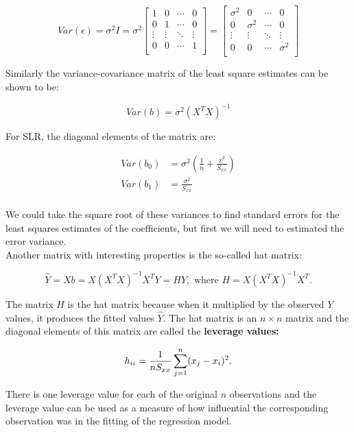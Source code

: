 \documentclass[a4paper, 11pt, twoside]{article}
\begin{document}
\[Var(\epsilon)=\sigma^2I=\sigma^2
\begin{bmatrix}
	1 & 0 & \cdots & 0\\
	0 & 1 & \cdots & 0\\
	\vdots & \vdots & \ddots & \vdots\\
	0 & 0 & \cdots & 1\\	
\end{bmatrix}
=
\begin{bmatrix}
	\sigma^2 & 0 & \cdots & 0\\
	0 & \sigma^2 & \cdots & 0\\
	\vdots & \vdots & \ddots & \vdots\\
	0 & 0 & \cdots & \sigma^2\\	
\end{bmatrix}
\]

Similarly the variance-covariance matrix of the least square estimates can be shown to be:

\[Var(b)=\sigma^2(X^TX)^{-1}\]

For SLR, the diagonal elements of the matrix are:

\[
\begin{split}
	Var(b_0)&=\sigma^2\left(\frac{1}{n} + \frac{\bar{x}^2}{S_{xx}}\right)\\	
	Var(b_1)&=\frac{\sigma^2}{S_{xx}}\\
\end{split}
\]

We could take the square root of these variances to find standard errors for the least squares estimates of the coefficients, but first we will need to estimated the error variance.\\

Another matrix with interesting properties is the so-called hat matrix:

\[\hat{Y}=Xb=X(X^TX)^{-1}X^TY=HY, \text{ where } H=X(X^TX)^{-1}X^T.\]

The matrix $H$ is the hat matrix because when it multiplied by the observed $Y$ values, it produces the fitted values $\hat{Y}$. The hat matrix is an $n\times n$ matrix and the diagonal elements of this matrix are called the \textbf{leverage values:}

\[h_{ii} = \frac1{nS_{xx}}\sum\limits^n_{j=1}(x_j-x_i)^2.\\\]

There is one leverage value for each of the original $n$ observations and the leverage value can be used as a measure of how influential the corresponding observation was in the fitting of the  regression model.\\
\end{document}
